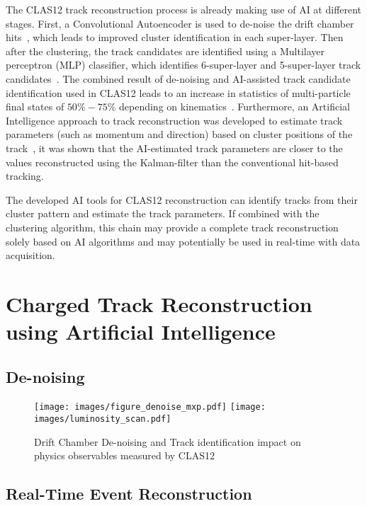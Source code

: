 \documentclass[preprint,12pt]{elsarticle}
\begin{document}
The CLAS12 track reconstruction process is already making use of AI at different stages.
First, a Convolutional
Autoencoder is used to de-noise the drift chamber hits~\cite{Thomadakis:2022zcd}, which leads to improved cluster
identification in each super-layer. Then after the clustering, the track candidates are identified using a Multilayer perceptron (MLP) classifier,
which identifies 6-super-layer and 5-super-layer track candidates~\cite{Gavalian:2020oxg}. The combined result of
de-noising and AI-assisted track candidate identification used in CLAS12 leads to an increase in statistics of multi-particle 
final states of $50\%-75\%$ depending on kinematics~\cite{Gavalian:2020xmc}. 
Furthermore, an Artificial Intelligence approach to track reconstruction was developed to estimate track parameters 
(such as momentum and direction) based on cluster positions of the track~\cite{Thomadakis:2023ebe}, it was shown that 
the AI-estimated track parameters are closer to the values reconstructed using the Kalman-filter than the 
conventional hit-based tracking.

The developed AI tools for CLAS12 reconstruction can identify tracks from their cluster pattern and estimate the track parameters.
If combined with the clustering algorithm, this chain may provide a complete track reconstruction solely based on AI algorithms and
may potentially be used in real-time with data acquisition. 

%
%

\section{Charged Track Reconstruction using Artificial Intelligence}

\subsection{De-noising}

\begin{figure}[h!]
\centering
\texttt{[image: images/figure\_denoise\_mxp.pdf]}
\texttt{[image: images/luminosity\_scan.pdf]}
\caption{Drift Chamber De-noising and Track identification impact on physics observables measured by CLAS12} 
\label{fig:drift_chambers_denoise}
\end{figure}

\subsection{Real-Time Event Reconstruction}
\end{document}
